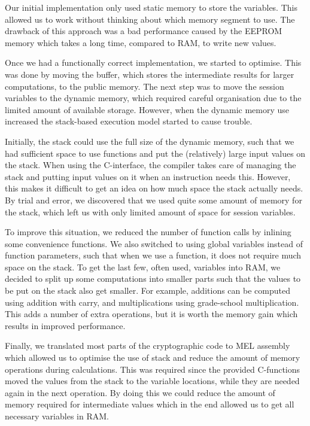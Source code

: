 Our initial implementation only used static memory to store the variables. This
allowed us to work without thinking about which memory segment to use. The
drawback of this approach was a bad performance caused by the EEPROM memory
which takes a long time, compared to RAM, to write new values.

Once we had a functionally correct implementation, we started to optimise. This
was done by moving the buffer, which stores the intermediate results for larger
computations, to the public memory. The next step was to move the session
variables to the dynamic memory, which required careful organisation due to the
limited amount of available storage. However, when the dynamic memory use
increased the stack-based execution model started to cause trouble.

Initially, the stack could use the full size of the dynamic memory, such that
we had sufficient space to use functions and put the (relatively) large input
values on the stack. When using the C-interface, the compiler takes care of
managing the stack and putting input values on it when an instruction needs
this. However, this makes it difficult to get an idea on how much space the
stack actually needs. By trial and error, we discovered that we used quite some
amount of memory for the stack, which left us with only limited amount of space
for session variables.

To improve this situation, we reduced the number of function calls by inlining
some convenience functions. We also switched to using global variables instead
of function parameters, such that when we use a function, it does not require
much space on the stack. To get the last few, often used, variables into RAM,
we decided to split up some computations into smaller parts such that the
values to be put on the stack also get smaller. For example, additions can be
computed using addition with carry, and multiplications using grade-school
multiplication. This adds a number of extra operations, but it is worth the
memory gain which results in improved performance.

Finally, we translated most parts of the cryptographic code to MEL assembly
which allowed us to optimise the use of stack and reduce the amount of memory
operations during calculations. This was required since the provided C-functions
moved the values from the stack to the variable locations, while they are needed
again in the next operation. By doing this we could reduce the amount of memory
required for intermediate values which in the end allowed us to get all
necessary variables in RAM.

